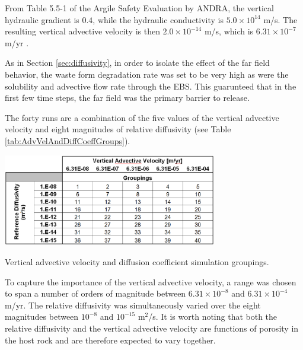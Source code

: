 From Table 5.5-1 of the Argile Safety Evaluation by \gls{ANDRA}, the vertical 
hydraulic gradient is $0.4$, while the hydraulic conductivity is 
$5.0\times10^{14}$ m/s. The resulting vertical advective velocity is then 
$2.0\times10^{-14}$ m/s, which is 
$6.31\times10^{-7}$ m/yr  \cite{andra_argile:_2005}. %


As in Section \ref{sec:diffusivity}, in order to isolate the effect of the far 
field behavior, the waste form degradation rate was set to be very high as were 
the solubility and advective flow rate through the  \gls{EBS}. This guarunteed 
that in the first few time steps, the far field was the primary barrier to 
release. 

The forty runs are a combination of the five values of the vertical advective 
velocity and eight magnitudes of relative diffusivity (see Table 
\ref{tab:AdvVelAndDiffCoeffGroups}). 

\begin{table}[hbp!]
\centering
\includegraphics[width=0.7\textwidth]{./chapters/nuclide_sensitivity/clay/AdvVelAndDiffCoeffEBSFail/AdvVelAndDiffCoeffGroups.eps}
\caption{Vertical advective velocity and diffusion coefficient simulation groupings.}
\label{tab:AdvVelAndDiffCoeffGroups}
\end{table}


To capture the importance of the vertical advective velocity, a range was chosen 
to span a number of orders of magnitude between $ 6.31\times 10^{-8}$ 
and $ 6.31\times10^{-4}$ m/yr. The relative diffusivity was simultaneously varied 
over the eight magnitudes between $ 10^{-8}$ and $ 10^{-15}$ m$^2$/s. It is 
worth noting that both the relative diffusivity and the vertical advective 
velocity are functions of porosity in the host rock and are therefore expected 
to vary together. 





